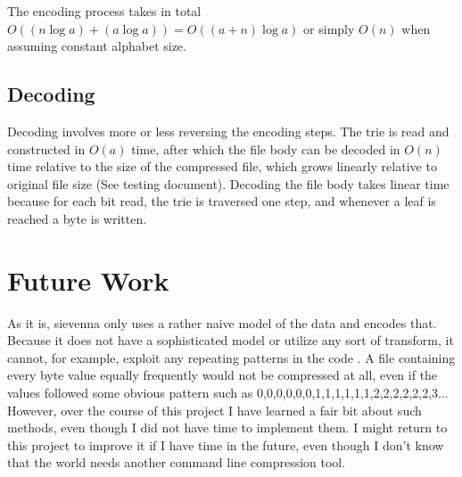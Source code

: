 \documentclass[11pt,a4paper,oneside,notitlepage,final]{article}
\begin{document}
	The encoding process takes in total $ O((n \log a) + (a \log a)) = O((a+n)\log a) $ or simply $ O(n) $ when assuming constant alphabet size.
	
	\subsection{Decoding}
	
	Decoding involves more or less reversing the encoding steps.
	The trie is read and constructed in $ O(a) $ time, after which the file body can be decoded in $ O(n) $ time relative to the size of the compressed file, which grows linearly relative to original file size (See testing document). Decoding the file body takes linear time because for each bit read, the trie is traversed one step, and whenever a leaf is reached a byte is written.
	
	\section{Future Work}
	
	As it is, sievenna only uses a rather naive model of the data and encodes that. Because it does not have a sophisticated model or utilize any sort of transform, it cannot, for example, exploit any repeating patterns in the code \cite{mahoney2012data}. A file containing every byte value equally frequently would not be compressed at all, even if the values followed some obvious pattern such as 0,0,0,0,0,0,1,1,1,1,1,1,2,2,2,2,2,2,3... However, over the course of this project I have learned a fair bit about such methods, even though I did not have time to implement them. I might return to this project to improve it if I have time in the future, even though I don't know that the world needs another command line compression tool.
	
	
	
\end{document}
